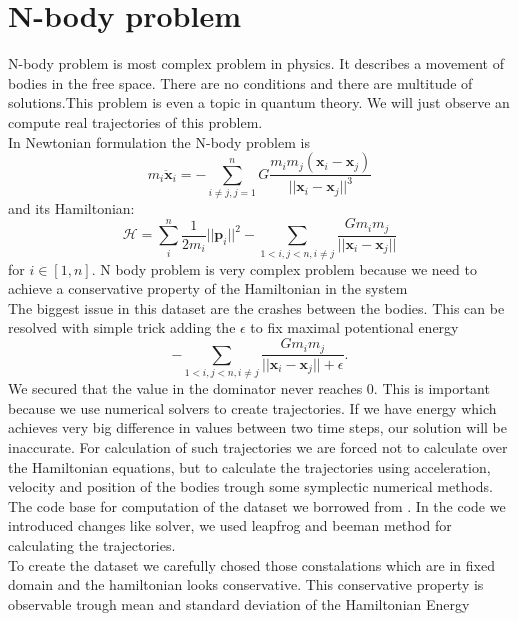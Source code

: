 \section{N-body problem}
N-body problem is most complex problem in physics. It describes a movement of bodies in the free space. There are no conditions and there are multitude of solutions.This problem is even a topic in quantum theory. We will just observe an compute real trajectories of this problem.\\ 
In Newtonian formulation the N-body problem is
\begin{equation}
m_i\ddot{\mathbf{x}}_i = -\sum_{i\neq j, j=1}^nG\frac{m_im_j(\mathbf{x}_i-\mathbf{x}_j)}{||\mathbf{x}_i-\mathbf{x}_j||^3}
\end{equation} 
and its Hamiltonian:
\begin{equation}
	\mathcal{H} =\sum_i^n \frac{1}{2m_i}||\mathbf{p}_i||^2 - \sum_{1<i,j<n,i\neq j}\frac{Gm_im_j}{||\mathbf{x}_i-\mathbf{x}_j||}
\end{equation} 
for $i \in[1,n].$
N body problem is very complex problem because we need to achieve a conservative property of the Hamiltonian in the system\\
The biggest issue in this dataset are the crashes between the bodies.
This can be resolved with simple trick adding the $\epsilon$ to fix maximal potentional energy
\begin{equation}
	- \sum_{1<i,j<n,i\neq j}\frac{Gm_im_j}{||\mathbf{x}_i-\mathbf{x}_j||+\epsilon}.
\end{equation}
We secured that the value in the dominator never reaches 0. This is important because we use numerical solvers to create trajectories. If we have energy which achieves very big difference in values between two time steps, our solution will be inaccurate.  For calculation of such trajectories we are forced not to calculate over the Hamiltonian equations, but to calculate the trajectories using acceleration, velocity and position of the bodies trough some symplectic numerical methods. The code base for computation of the dataset we borrowed from \cite{nb}. In the code we introduced changes like solver, we used leapfrog and beeman method for calculating the trajectories.\\
To create the dataset we carefully chosed those constalations which are in fixed domain and the hamiltonian looks conservative. This conservative property is observable trough mean and standard deviation of the Hamiltonian Energy 
